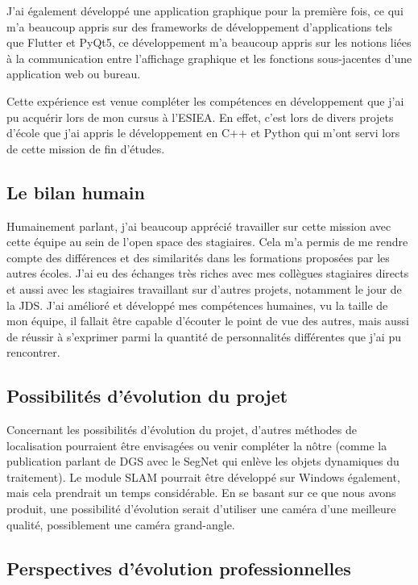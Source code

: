 \documentclass[11pt]{article}
\begin{document}
      J'ai également développé une application graphique pour la première fois, ce qui m'a beaucoup appris sur des frameworks de 
      développement d'applications tels que Flutter et PyQt5, ce développement m'a beaucoup appris sur les notions liées 
      à la communication entre l'affichage graphique et les fonctions sous-jacentes d'une application web ou bureau.

      Cette expérience est venue compléter les compétences en développement que j'ai pu acquérir lors de mon cursus à l'ESIEA. En
      effet, c'est lors de divers projets d'école que j'ai appris le développement en C++ et Python qui m'ont servi lors de cette 
      mission de fin d'études.

    \subsection{Le bilan humain}
      Humainement parlant, j'ai beaucoup apprécié travailler sur cette mission avec cette équipe au sein de l'open space des
      stagiaires. Cela m'a permis de me rendre compte des différences et des similarités dans les formations proposées par les 
      autres écoles. J'ai eu des échanges très riches avec mes collègues stagiaires directs et aussi avec les stagiaires travaillant 
      sur d'autres projets, notamment le jour de la JDS.    
      J'ai amélioré et développé mes compétences humaines, vu la taille de mon équipe, il fallait être capable 
      d'écouter le point de vue des autres, mais aussi de réussir à s'exprimer parmi la quantité de personnalités 
      différentes que j'ai pu rencontrer.

    \pagebreak
    
    \subsection{Possibilités d'évolution du projet}
      Concernant les possibilités d'évolution du projet, d'autres méthodes de localisation pourraient être envisagées ou venir
      compléter la nôtre (comme la publication parlant de DGS avec le SegNet qui enlève les objets dynamiques du traitement).
      Le module SLAM pourrait être développé sur Windows également, mais cela prendrait un temps considérable. 
      En se basant sur ce que nous avons produit, une possibilité d'évolution serait d'utiliser une caméra d'une meilleure qualité, 
      possiblement une caméra grand-angle.  

    \subsection{Perspectives d'évolution professionnelles}
\end{document}
